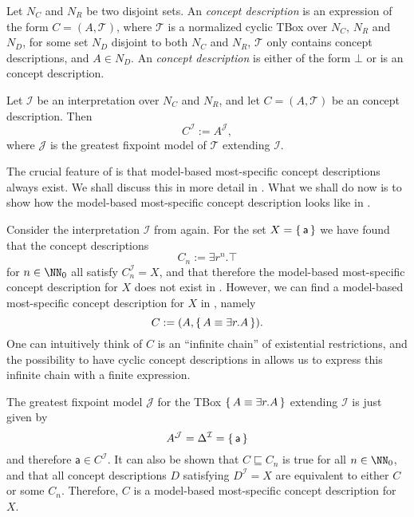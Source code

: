 \begin{Definition}
  \label{def:ELgfpbot-concept-descriptions-and-their-semantics}
  Let $N_C$ and $N_R$ be two disjoint sets.  An \emph{\ELgfp concept description} is an
  expression of the form $C = (A, \mathcal{T})$, where $\mathcal{T}$ is a normalized
  cyclic TBox over $N_C$, $N_R$ and $N_D$, for some set $N_D$ disjoint to both $N_C$ and
  $N_R$, $\mathcal{T}$ only contains \EL concept descriptions, and $A \in N_D$.  An
  \emph{\ELgfpbot concept description} is either of the form $\bot$ or is an \ELgfp
  concept description.

  Let $\mathcal{I}$ be an interpretation over $N_{C}$ and $N_{R}$, and let $C = (A,
  \mathcal{T})$ be an \ELgfpbot concept description.  Then
  \begin{equation*}
    C^{\mathcal{I}} := A^{\mathcal{J}},
  \end{equation*}
  where $\mathcal{J}$ is the greatest fixpoint model of $\mathcal{T}$ extending
  $\mathcal{I}$.
\end{Definition}

The crucial feature of \ELgfpbot is that model-based most-specific concept descriptions
always exist.  We shall discuss this in more detail in .  What we
shall do now is to show how the model-based most-specific concept description looks like
in .

\begin{Example}
  \label{expl:mmsc-exist-in-ELgfpbot}
  Consider the interpretation $\mathcal{I}$ from 
  again.  For the set $X = {\{\, \mathsf{a} \,\}}$ we have found that the concept descriptions
  \begin{equation*}
    C_n := \exists r^n. \top
  \end{equation*}
  for $n \in \NN_0$ all satisfy $C_n^{\mathcal{I}} = X$, and that therefore the
  model-based most-specific concept description for $X$ does not exist in \ELbot.
  However, we can find a model-based most-specific concept description for $X$ in
  \ELgfpbot, namely
  \begin{equation*}
    C := (A, {\{\, A \equiv \exists r. A \,\}}).
  \end{equation*}
  One can intuitively think of $C$ is an ``infinite chain'' of existential restrictions,
  and the possibility to have cyclic concept descriptions in \ELgfpbot allows us to
  express this infinite chain with a finite expression.

  The greatest fixpoint model $\mathcal{J}$ for the TBox ${\{\, A \equiv \exists r. A \,\}}$
  extending $\mathcal{I}$ is just given by
  \begin{equation*}
    A^{\mathcal{J}} = \Delta^{\mathcal{I}} = {\{\, \mathsf{a} \,\}}
  \end{equation*}
  and therefore $\mathsf{a} \in C^{\mathcal{I}}$.  It can also be shown that $C
  \sqsubseteq C_n$ is true for all $n \in \NN_0$, and that all \ELgfpbot concept
  descriptions $D$ satisfying $D^{\mathcal{I}} = X$ are equivalent to either $C$ or some
  $C_n$.  Therefore, $C$ is a model-based most-specific concept description for $X$.
\end{Example}

